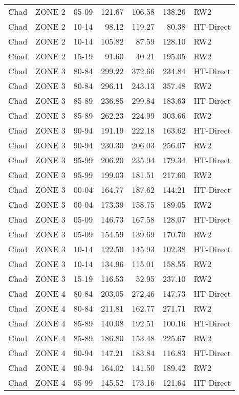 \begin{longtable}{lllrrrl}
  Chad & ZONE 2 & 05-09 & 121.67 & 106.58 & 138.26 & RW2 \\ 
  Chad & ZONE 2 & 10-14 & 98.12 & 119.27 & 80.38 & HT-Direct \\ 
  Chad & ZONE 2 & 10-14 & 105.82 & 87.59 & 128.10 & RW2 \\ 
  Chad & ZONE 2 & 15-19 & 91.60 & 40.21 & 195.05 & RW2 \\ 
  Chad & ZONE 3 & 80-84 & 299.22 & 372.66 & 234.84 & HT-Direct \\ 
  Chad & ZONE 3 & 80-84 & 296.11 & 243.13 & 357.48 & RW2 \\ 
  Chad & ZONE 3 & 85-89 & 236.85 & 299.84 & 183.63 & HT-Direct \\ 
  Chad & ZONE 3 & 85-89 & 262.23 & 224.99 & 303.66 & RW2 \\ 
  Chad & ZONE 3 & 90-94 & 191.19 & 222.18 & 163.62 & HT-Direct \\ 
  Chad & ZONE 3 & 90-94 & 230.30 & 206.03 & 256.07 & RW2 \\ 
  Chad & ZONE 3 & 95-99 & 206.20 & 235.94 & 179.34 & HT-Direct \\ 
  Chad & ZONE 3 & 95-99 & 199.03 & 181.51 & 217.60 & RW2 \\ 
  Chad & ZONE 3 & 00-04 & 164.77 & 187.62 & 144.21 & HT-Direct \\ 
  Chad & ZONE 3 & 00-04 & 173.39 & 158.75 & 189.05 & RW2 \\ 
  Chad & ZONE 3 & 05-09 & 146.73 & 167.58 & 128.07 & HT-Direct \\ 
  Chad & ZONE 3 & 05-09 & 154.59 & 139.69 & 170.70 & RW2 \\ 
  Chad & ZONE 3 & 10-14 & 122.50 & 145.93 & 102.38 & HT-Direct \\ 
  Chad & ZONE 3 & 10-14 & 134.96 & 115.01 & 158.55 & RW2 \\ 
  Chad & ZONE 3 & 15-19 & 116.53 & 52.95 & 237.10 & RW2 \\ 
  Chad & ZONE 4 & 80-84 & 203.05 & 272.46 & 147.73 & HT-Direct \\ 
  Chad & ZONE 4 & 80-84 & 211.81 & 162.77 & 271.71 & RW2 \\ 
  Chad & ZONE 4 & 85-89 & 140.08 & 192.51 & 100.16 & HT-Direct \\ 
  Chad & ZONE 4 & 85-89 & 186.80 & 153.48 & 225.67 & RW2 \\ 
  Chad & ZONE 4 & 90-94 & 147.21 & 183.84 & 116.83 & HT-Direct \\ 
  Chad & ZONE 4 & 90-94 & 164.02 & 141.50 & 189.42 & RW2 \\ 
  Chad & ZONE 4 & 95-99 & 145.52 & 173.16 & 121.64 & HT-Direct \\ 

\end{longtable}
